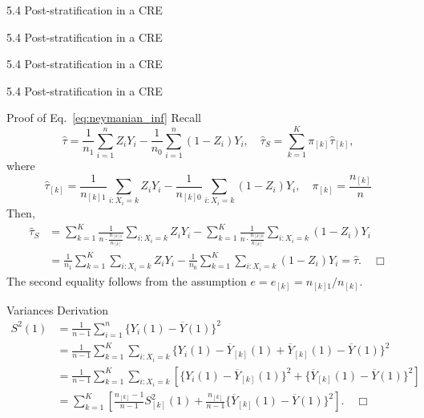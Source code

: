 \documentclass[aspectratio=169, 12pt]{beamer}
\begin{document}
\begin{frame}{5.4 Post-stratification in a CRE}
  
\end{frame}

\begin{frame}{5.4 Post-stratification in a CRE}
  
\end{frame}

\begin{frame}{5.4 Post-stratification in a CRE}
  
\end{frame}

\begin{frame}{5.4 Post-stratification in a CRE}
  
\end{frame}

\begin{frame}[label=pf-neymanian]{Proof of Eq.~\eqref{eq:neymanian_inf}}
  \footnotesize
    Recall 
    \[
    \widehat{\tau} = \frac{1}{n_1}\sum_{i=1}^{n}Z_iY_i-\frac{1}{n_0}\sum_{i=1}^{n}(1-Z_i)Y_i, \quad \widehat{\tau}_S = \sum_{k=1}^{K}\pi_{[k]}\widehat{\tau}_{[k]},
    \]
    where 
    \[
    \widehat{\tau}_{[k]} = \frac{1}{n_{[k]1}}\sum_{i:X_i=k}^{}Z_iY_i - \frac{1}{n_{[k]0}}\sum_{i:X_i=k}^{}(1-Z_i)Y_i, \quad \pi_{[k]} = \frac{n_{[k]}}{n}
    \]
    Then,
    \begin{align*}
      \widehat{\tau}_S 
      &= \sum_{k=1}^{K}\frac{1}{n\cdot \frac{n_{[k]1}}{n_{[k]}}}\sum_{i:X_i=k}^{}Z_iY_i - \sum_{k=1}^{K}\frac{1}{n\cdot \frac{n_{[k]0}}{n_{[k]}}}\sum_{i:X_i=k}^{}(1-Z_i)Y_i \\
      &= \frac{1}{n_1}\sum_{k=1}^{K}\sum_{i:X_i=k}^{}Z_iY_i-\frac{1}{n_0}\sum_{k=1}^{K}\sum_{i:X_i=k}^{}(1-Z_i)Y_i
      =\widehat{\tau}. \quad \Box
    \end{align*}
    The second equality follows from the assumption $e=e_{[k]}=n_{[k]1}/n_{[k]}.$
  \vfill
  \hfill\hyperlink{neymanian<1>}{}
\end{frame}

\begin{frame}[label=pf-variances]{Variances Derivation}
  \small
    \begin{align*}
    S^2(1) 
    &= \frac{1}{n-1}\sum_{i=1}^{n}\{Y_i(1)-\overline{Y}(1)\}^2\\
    &= \frac{1}{n-1}\sum_{k=1}^{K}\sum_{i:X_i=k}^{}\{Y_i(1)-\overline{Y}_{[k]}(1)+\overline{Y}_{[k]}(1)-\overline{Y}(1)\}^2\\
    &= \frac{1}{n-1}\sum_{k=1}^{K}\sum_{i:X_i=k}^{}[\{Y_i(1)-\overline{Y}_{[k]}(1)\}^2+\{\overline{Y}_{[k]}(1)-\overline{Y}(1)\}^2]\\
    &= \sum_{k=1}^{K}\left[
      \frac{n_{[k]}-1}{n-1}S_{[k]}^2(1)+\frac{n_{[k]}}{n-1}\{\overline{Y}_{[k]}(1)-\overline{Y}(1)\}^2
    \right]. \quad \Box
  \end{align*}
  \vfill
  \hfill\hyperlink{variances<1>}{}
\end{frame}
\end{document}
